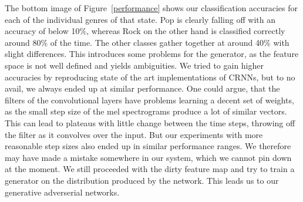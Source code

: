     The bottom image of Figure~\ref{performance} shows our classification accuracies for each of the individual genres of that state.
    Pop is clearly falling off with an accuracy of below 10$\%$, whereas Rock on the other hand is classified correctly around 80$\%$ of the time.
    The other classes gather together at around 40$\%$ with slight differences.
    This introduces some problems for the generator, as the feature space is not well defined and yields ambiguities.
    We tried to gain higher accuracies by reproducing state of the art implementations of CRNNs, but to no avail, we always ended up at similar performance.
    One could argue, that the filters of the convolutional layers have problems learning a decent set of weights, as the small step size of the mel spectrograms produce a lot of similar vectors.
    This can lead to plateaus with little change between the time steps, throwing off the filter as it convolves over the input.
    But our experiments with more reasonable step sizes also ended up in similar performance ranges.
    We therefore may have made a mistake somewhere in our system, which we cannot pin down at the moment.
    We still proceeded with the dirty feature map and try to train a generator on the distribution produced by the network. This leads us to our generative adverserial networks.